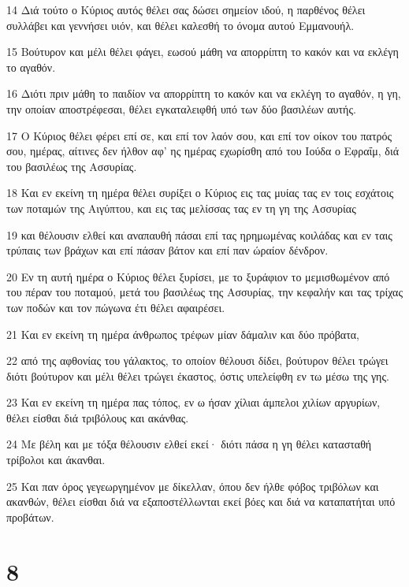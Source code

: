 \par 14 Διά τούτο ο Κύριος αυτός θέλει σας δώσει σημείον ιδού, η παρθένος θέλει συλλάβει και γεννήσει υιόν, και θέλει καλεσθή το όνομα αυτού Εμμανουήλ.
\par 15 Βούτυρον και μέλι θέλει φάγει, εωσού μάθη να απορρίπτη το κακόν και να εκλέγη το αγαθόν.
\par 16 Διότι πριν μάθη το παιδίον να απορρίπτη το κακόν και να εκλέγη το αγαθόν, η γη, την οποίαν αποστρέφεσαι, θέλει εγκαταλειφθή υπό των δύο βασιλέων αυτής.
\par 17 Ο Κύριος θέλει φέρει επί σε, και επί τον λαόν σου, και επί τον οίκον του πατρός σου, ημέρας, αίτινες δεν ήλθον αφ' ης ημέρας εχωρίσθη από του Ιούδα ο Εφραΐμ, διά του βασιλέως της Ασσυρίας.
\par 18 Και εν εκείνη τη ημέρα θέλει συρίξει ο Κύριος εις τας μυίας τας εν τοις εσχάτοις των ποταμών της Αιγύπτου, και εις τας μελίσσας τας εν τη γη της Ασσυρίας
\par 19 και θέλουσιν ελθεί και αναπαυθή πάσαι επί τας ηρημωμένας κοιλάδας και εν ταις τρύπαις των βράχων και επί πάσαν βάτον και επί παν ώραίον δένδρον.
\par 20 Εν τη αυτή ημέρα ο Κύριος θέλει ξυρίσει, με το ξυράφιον το μεμισθωμένον από του πέραν του ποταμού, μετά του βασιλέως της Ασσυρίας, την κεφαλήν και τας τρίχας των ποδών και τον πώγωνα έτι θέλει αφαιρέσει.
\par 21 Και εν εκείνη τη ημέρα άνθρωπος τρέφων μίαν δάμαλιν και δύο πρόβατα,
\par 22 από της αφθονίας του γάλακτος, το οποίον θέλουσι δίδει, βούτυρον θέλει τρώγει διότι βούτυρον και μέλι θέλει τρώγει έκαστος, όστις υπελείφθη εν τω μέσω της γης.
\par 23 Και εν εκείνη τη ημέρα πας τόπος, εν ω ήσαν χίλιαι άμπελοι χιλίων αργυρίων, θέλει είσθαι διά τριβόλους και ακάνθας.
\par 24 Με βέλη και με τόξα θέλουσιν ελθεί εκεί· διότι πάσα η γη θέλει κατασταθή τρίβολοι και άκανθαι.
\par 25 Και παν όρος γεγεωργημένον με δίκελλαν, όπου δεν ήλθε φόβος τριβόλων και ακανθών, θέλει είσθαι διά να εξαποστέλλωνται εκεί βόες και διά να καταπατήται υπό προβάτων.

\chapter{8}

